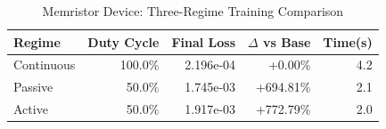 \begin{table}[htbp]
\centering
\caption{Memristor Device: Three-Regime Training Comparison}
\label{tab:memristor_regimes}
\begin{tabular}{lrrrr}
\hline
Regime & Duty Cycle & Final Loss & $\Delta$ vs Base & Time(s) \\
\hline
Continuous & 100.0\% & 2.196e-04 & +0.00\% & 4.2 \\
Passive & 50.0\% & 1.745e-03 & +694.81\% & 2.1 \\
Active & 50.0\% & 1.917e-03 & +772.79\% & 2.0 \\
\hline
\end{tabular}
\end{table}

